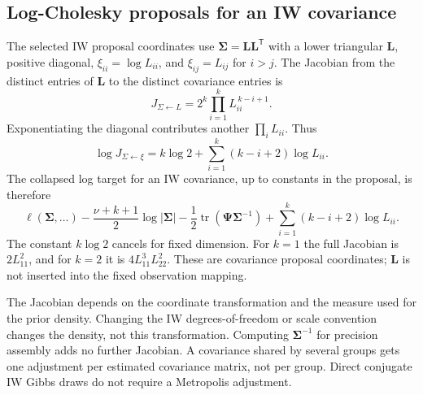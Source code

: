 \documentclass[11pt]{article}
\newcommand{\bL}{\bm{L}}
\newcommand{\bSigma}{\bm{\Sigma}}
\newcommand{\trans}{^{\mathsf T}}
\DeclareMathOperator{\tr}{tr}
\begin{document}
\subsection{Log-Cholesky proposals for an IW covariance}
The selected IW proposal coordinates use $\bSigma=\bL\bL\trans$ with a lower
triangular $\bL$, positive diagonal, $\xi_{ii}=\log L_{ii}$, and
$\xi_{ij}=L_{ij}$ for $i>j$. The Jacobian from the distinct entries of
$\bL$ to the distinct covariance entries is \cite{Banerjee2008}
\begin{equation}
 J_{\Sigma\leftarrow L}=2^k\prod_{i=1}^k L_{ii}^{\,k-i+1}.
\end{equation}
Exponentiating the diagonal contributes another $\prod_i L_{ii}$. Thus
\begin{equation}\label{eq:log-cholesky-jacobian}
 \log J_{\Sigma\leftarrow\xi}
 =k\log 2+\sum_{i=1}^k(k-i+2)\log L_{ii}.
\end{equation}
The collapsed log target for an IW covariance, up to constants in the proposal,
is therefore
\begin{equation}\label{eq:iw-log-cholesky-target}
 \ell(\bSigma,\ldots)-\frac{\nu+k+1}{2}\log|\bSigma|
 -\frac12\tr(\bm{\Psi}\bSigma^{-1})
 +\sum_{i=1}^k(k-i+2)\log L_{ii}.
\end{equation}
The constant $k\log2$ cancels for fixed dimension. For $k=1$ the full Jacobian
is $2L_{11}^2$, and for $k=2$ it is $4L_{11}^3L_{22}^2$.
These are covariance proposal coordinates; $\bL$ is not inserted into the fixed
observation mapping.

The Jacobian depends on the coordinate transformation and the measure used for
the prior density. Changing the IW degrees-of-freedom or scale convention changes
the density, not this transformation. Computing $\bSigma^{-1}$ for precision
assembly adds no further Jacobian. A covariance shared by several groups gets
one adjustment per estimated covariance matrix, not per group. Direct conjugate
IW Gibbs draws do not require a Metropolis adjustment.
\end{document}
